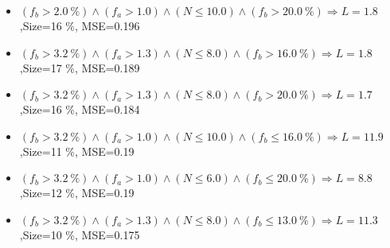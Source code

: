 \documentclass[numbered]{CSL}
\begin{document}
\begin{itemize}
\item $(f_b > 2.0~\%) \land (f_a > 1.0) \land (N \leq 10.0) \land (f_b > 20.0~\%) \Rightarrow L = 1.8$,\hfill Size=16 \%, MSE=0.196
\item $(f_b > 3.2~\%) \land (f_a > 1.3) \land (N \leq 8.0) \land (f_b > 16.0~\%) \Rightarrow L = 1.8$,\hfill Size=17 \%, MSE=0.189
\item $(f_b > 3.2~\%) \land (f_a > 1.3) \land (N \leq 8.0) \land (f_b > 20.0~\%) \Rightarrow L = 1.7$,\hfill Size=16 \%, MSE=0.184
\item $(f_b > 3.2~\%) \land (f_a > 1.0) \land (N \leq 10.0) \land (f_b \leq 16.0~\%) \Rightarrow L = 11.9$,\hfill Size=11 \%, MSE=0.19
\item $(f_b > 3.2~\%) \land (f_a > 1.0) \land (N \leq 6.0) \land (f_b \leq 20.0~\%) \Rightarrow L = 8.8$,\hfill Size=12 \%, MSE=0.19
\item $(f_b > 3.2~\%) \land (f_a > 1.3) \land (N \leq 8.0) \land (f_b \leq 13.0~\%) \Rightarrow L = 11.3$,\hfill Size=10 \%, MSE=0.175
\end{itemize}
\end{document}
